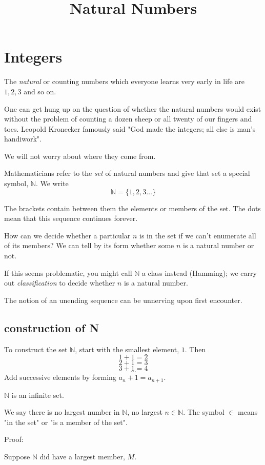 \documentclass[11pt, oneside]{article}
\title{Natural Numbers}
\date{}
\begin{document}
\maketitle
\Large
\section*{Integers}

The \emph{natural} or counting numbers which everyone learns very early in life are $1, 2, 3$ and so on.

One can get hung up on the question of whether the natural numbers would exist without the problem of counting a dozen sheep or all twenty of our fingers and toes.  Leopold Kronecker famously said "God made the integers; all else is man's handiwork".

We will not worry about where they come from.

Mathematicians refer to the \emph{set} of natural numbers and give that set a special symbol, $\mathbb{N}$.  We write
\[ \mathbb{N} = \{ 1, 2, 3 \dots \} \]

The brackets contain between them the elements or members of the set. The dots mean that this sequence continues forever.

How can we decide whether a particular $n$ is in the set if we can't enumerate all of its members?  We can tell by its form whether some $n$ is a natural number or not.  

If this seems problematic, you might call $\mathbb{N}$ a class instead (Hamming);  we carry out \emph{classification} to decide whether $n$ is a natural number.

The notion of an unending sequence can be unnerving upon first encounter.

\subsection*{construction of N}

To construct the set $\mathbb{N}$, start with the smallest element, $1$.  Then 
\[ 1 + 1 = 2 \]
\[ 2 + 1 = 3 \]
\[ 3 + 1 = 4 \]
\[ \dots \]
Add successive elements by forming $a_n + 1 = a_{n+1}$.

$\mathbb{N}$ is an infinite set.

We say there is no largest number in $\mathbb{N}$, no largest $n \in \mathbb{N}$.  The symbol $\in$ means "in the set" or "is a member of the set".

Proof:  

Suppose $\mathbb{N}$ did have a largest member, $M$.  
\end{document}
